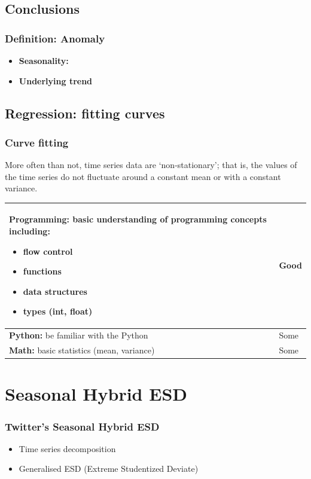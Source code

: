 \documentclass[aspectratio=169]{beamer}
\begin{document}
\subsection{Conclusions}
\begin{frame}
\frametitle{Definition: Anomaly}
\begin{itemize}
\item {\bf Seasonality:}    
\item {\bf Underlying trend}
 
\end{itemize}
\end{frame}


\subsection{Regression: fitting curves}
\begin{frame}
\frametitle{Curve fitting}
More often than not, time series data are `non-stationary'; that is, the values of the time series do not fluctuate around a constant mean or with a constant variance.
\begin{tabular}{|p{8cm} | l|}
\hline
{{\bf Programming:} basic understanding of programming concepts including:
	\begin{itemize}
		\item flow control
		\item functions
		\item data structures
		\item types (int, float)
	\end{itemize}} & Good \\ \hline
{\bf Python:} be familiar with the Python & Some \\ \hline
{\bf Math:} basic statistics (mean, variance) & Some \\
\hline
\end{tabular}
\end{frame}

\section{Seasonal Hybrid ESD}
\begin{frame}
\frametitle{Twitter's Seasonal Hybrid ESD}
\begin{itemize}
    \item Time series decomposition
    \item Generalised ESD (Extreme Studentized Deviate)
\end{itemize}

\end{frame}
\end{document}
